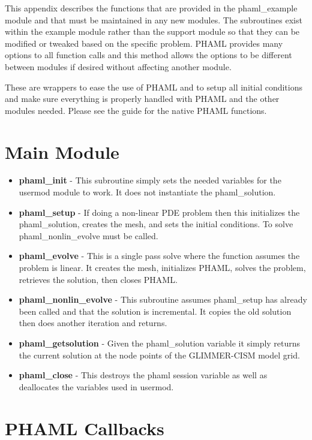 
This appendix describes the functions that are provided in the phaml\_example module and that must be maintained in any new modules.  The subroutines exist within the example module rather than the support module so that they can be modified or tweaked based on the specific problem.  PHAML provides many options to all function calls and this method allows the options to be different between modules if desired without affecting another module.

These are wrappers to ease the use of PHAML and to setup all initial conditions and make sure everything is properly handled with PHAML and the other modules needed.  Please see the guide for the native PHAML functions. \citep{phamldoc} 

\section{Main Module}\label{sec:libfuncmain}

\begin{itemize}
\item \textbf{phaml\_init} - This subroutine simply sets the needed variables for the usermod module to work.  It does not instantiate the phaml\_solution.
\item \textbf{phaml\_setup} - If doing a non-linear PDE problem then this initializes the phaml\_solution, creates the mesh, and sets the initial conditions.  To solve phaml\_nonlin\_evolve must be called.
\item \textbf{phaml\_evolve} - This is a single pass solve where the function assumes the problem is linear.  It creates the mesh, initializes PHAML, solves the problem, retrieves the solution, then closes PHAML.
\item \textbf{phaml\_nonlin\_evolve} - This subroutine assumes phaml\_setup has already been called and that the solution is incremental.  It copies the old solution then does another iteration and returns.
\item \textbf{phaml\_getsolution} - Given the phaml\_solution variable it simply returns the current solution at the node points of the GLIMMER-CISM model grid. 
\item \textbf{phaml\_close} - This destroys the phaml session variable as well as deallocates the variables used in usermod.
\end{itemize}

\section{PHAML Callbacks}\label{sec:libphamlcall}

